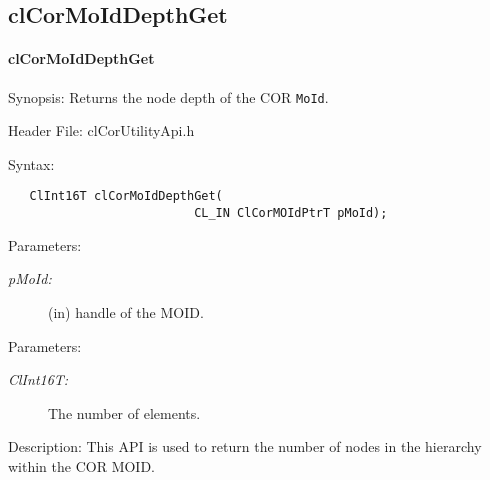 \begin{flushleft}
\subsection{clCorMoIdDepthGet}
\hypertarget{pagecor118}{}\paragraph{cl\-Cor\-MoId\-Depth\-Get}\label{pagecor118}

\begin{Desc}
\item[Synopsis:]Returns the node depth of the COR {\tt{MoId}}. \end{Desc}

\begin{Desc}
\item[Header File:]clCorUtilityApi.h\end{Desc}

\begin{Desc}
\item[Syntax:]

\footnotesize\begin{verbatim}   ClInt16T clCorMoIdDepthGet(
			              CL_IN ClCorMOIdPtrT pMoId);
\end{verbatim}
\normalsize
\end{Desc}


\begin{Desc}
\item[Parameters:]
\begin{description}
\item[{\em p\-MoId:}](in) handle of the MOID.
\end{description}
\end{Desc}


\begin{Desc}
\item[Parameters:]
\begin{description}
\item[{\em ClInt16T:}]The number of elements.
\end{description}
\end{Desc}


 \begin{Desc}
\item[Description:]This API is used to return the number of nodes in the hierarchy within the COR MOID.
\end{Desc}



\end{flushleft}
